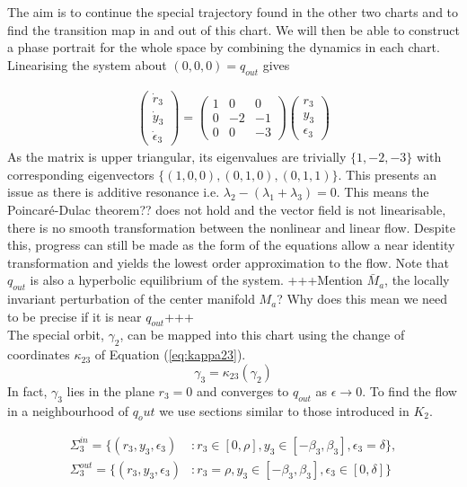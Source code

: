 The aim is to continue the special trajectory found in the other two charts and to find the transition map in and out of this chart. We will then be able to construct a phase portrait for the whole space by combining the dynamics in each chart.\\

Linearising the system about $(0,0,0)=q_{out}$ gives 

\begin{align*}
\begin{pmatrix}\dot{r}_3\\\dot{y}_3\\\dot{\epsilon}_3\end{pmatrix}= \begin{pmatrix}
1 & 0 & 0 \\ 
0 & -2 & -1 \\ 
0 & 0 & -3
\end{pmatrix} \begin{pmatrix}
r_3 \\ 
y_3 \\ 
\epsilon_3
\end{pmatrix} 
\end{align*}
As the matrix is upper triangular, its eigenvalues are trivially  $\lbrace 1,-2,-3\rbrace$ with corresponding eigenvectors $\lbrace (1,0,0),(0,1,0),(0,1,1)\rbrace$. This presents an issue as there is additive resonance i.e. $\lambda_2-(\lambda_1+\lambda_3)=0$.  This means the Poincar\'e-Dulac theorem?? does not hold and the vector field is not linearisable, there is no smooth transformation between the nonlinear and linear flow. Despite this, progress can still be made as the form of the equations allow a near identity transformation and yields the lowest order approximation to the flow. Note that $q_{out}$ is also  a hyperbolic equilibrium of the system. +++Mention $\bar{M}_a$, the locally invariant perturbation of the center manifold $M_a$? Why does this mean we need to be precise if it is near $q_{out}$+++\\

The special orbit, $\gamma_2$, can be mapped into this chart using the change of coordinates $\kappa_{23}$ of Equation (\ref{eq:kappa23}).
$$\gamma_3=\kappa_{23}(\gamma_2)$$
In fact, $\gamma_3$ lies in the plane $r_3=0$ and converges to $q_{out}$ as $\epsilon \to 0$. To find the flow in a neighbourhood of $q_out$ we use sections similar to those introduced in $K_2$.

\begin{align*} \Sigma_3^{in} =\lbrace(r_3,y_3,\epsilon_3) &: r_3\in[0,\rho], y_3 \in [-\beta_3,\beta_3], \epsilon_3=\delta\rbrace,\\
 \Sigma_3^{out} =\lbrace(r_3,y_3,\epsilon_3) &: r_3=\rho, y_3 \in [-\beta_3,\beta_3], \epsilon_3\in[0,\delta]\rbrace
\end{align*}

